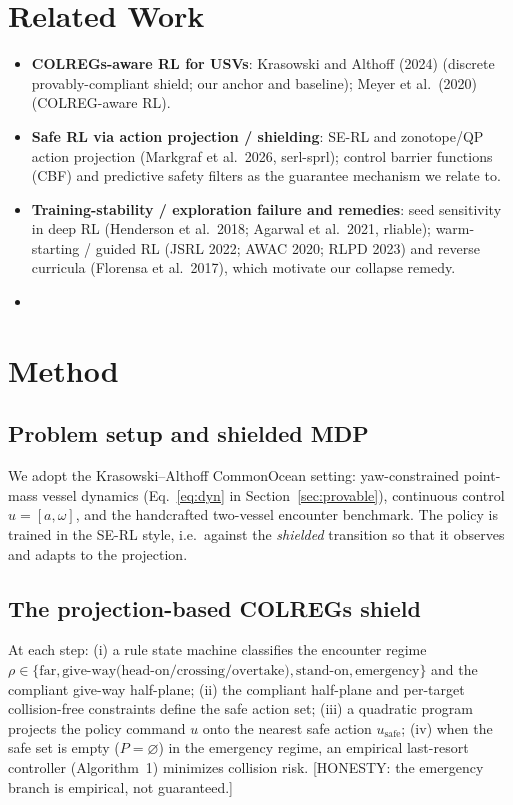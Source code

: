\documentclass[12pt,letterpaper]{article}
\theoremstyle{remark}\newtheorem*{scope}{Scope and honest limits}
\begin{document}
\section{Related Work}
\begin{itemize}
  \item \textbf{COLREGs-aware RL for USVs}: Krasowski and Althoff (2024) (discrete
  provably-compliant shield; our anchor and baseline); Meyer et al.\ (2020)
  (COLREG-aware RL).
  \item \textbf{Safe RL via action projection / shielding}: SE-RL and
  zonotope/QP action projection (Markgraf et al.\ 2026, serl-sprl); control
  barrier functions (CBF) and predictive safety filters as the guarantee mechanism
  we relate to.
  \item \textbf{Training-stability / exploration failure and remedies}: seed
  sensitivity in deep RL (Henderson et al.\ 2018; Agarwal et al.\ 2021, rliable);
  warm-starting / guided RL (JSRL 2022; AWAC 2020; RLPD 2023) and reverse
  curricula (Florensa et al.\ 2017), which motivate our collapse remedy.
  \item [PENDING: external baselines APF / VO-ORCA / CBF-QP for the Pareto
  comparison, Section~\ref{sec:results}.]
\end{itemize}

\section{Method}
\label{sec:method}
\subsection{Problem setup and shielded MDP}
We adopt the Krasowski--Althoff CommonOcean setting: yaw-constrained point-mass
vessel dynamics (Eq.~\ref{eq:dyn} in Section~\ref{sec:provable}), continuous
control $u=[a,\omega]$, and the handcrafted two-vessel encounter benchmark. The
policy is trained in the SE-RL style, i.e.\ against the \emph{shielded} transition
so that it observes and adapts to the projection.

\subsection{The projection-based COLREGs shield}
At each step: (i) a rule state machine classifies the encounter regime
$\rho\in\{\text{far},\text{give-way(head-on/crossing/overtake)},\text{stand-on},
\text{emergency}\}$ and the compliant give-way half-plane; (ii) the compliant
half-plane and per-target collision-free constraints define the safe action set;
(iii) a quadratic program projects the policy command $u$ onto the nearest safe
action $u_{\mathrm{safe}}$; (iv) when the safe set is empty ($P=\varnothing$) in
the emergency regime, an empirical last-resort controller (Algorithm~1) minimizes
collision risk. [HONESTY: the emergency branch is empirical, not guaranteed.]
\end{document}
